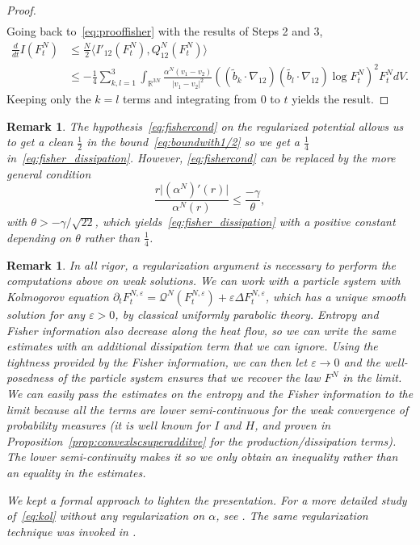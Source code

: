 \documentclass[11pt,a4paper]{article}
\theoremstyle{definition}
\theoremstyle{plain}
\newtheorem{remark}[defi]{Remark}
\begin{document}
\begin{proof}
\begin{align*}
    \end{align*}
    Going back to~\eqref{eq:prooffisher} with the results of Steps 2 and 3,
    \begin{align*}
        \frac{d}{dt} I(F^N_t) &\leq \frac{N}{2}\langle I'_{12}(F^N_t) , Q^N_{12} (F^N_t)\rangle \\
        &\leq -\frac{1}{4}\sum_{k,l=1}^3 \int_{\mathbb{R}^{3N}} \frac{\alpha^N(v_1-v_2)}{\vert v_1-v_2 \vert^2} \left( (\tilde{b}_k\cdot \nabla_{12})( \tilde{b_l}\cdot \nabla_{12})\log F^N_t \right)^2 F^N_t dV.
    \end{align*}
    Keeping only the $k=l$ terms and integrating from $0$ to $t$ yields the result.
    \end{proof}

\begin{remark}
    \label{rem:on0.99}
    The hypothesis~\eqref{eq:fishercond} on the regularized potential allows us to get a clean $\frac{1}{2}$ in the bound~\eqref{eq:boundwith1/2} so we get a $\frac{1}{4}$ in~\eqref{eq:fisher_dissipation}. However, \eqref{eq:fishercond} can be replaced by the more general condition
    \begin{equation*}
    \frac{r \vert (\alpha^{N})'(r) \vert}{\alpha^{N}(r)}\leq \frac{-\gamma}{\theta},
    \end{equation*}
    with $\theta> -\gamma /\sqrt{22}$, which yields~\eqref{eq:fisher_dissipation} with a positive constant depending on $\theta$ rather than
    $\frac{1}{4}$.
\end{remark}

\begin{remark}
    In all rigor, a regularization argument is necessary to perform the computations above on weak solutions. We can work with a particle system with Kolmogorov equation $\partial_t F^{N,\varepsilon}_t = \mathcal{Q}^N( F^{N,\varepsilon}_t)+\varepsilon \Delta F^{N,\varepsilon}_t$, which has a unique \textit{smooth} solution for any $\varepsilon>0$, by classical uniformly parabolic theory. Entropy and Fisher information also decrease along the heat flow, so we can write the same estimates with an additional dissipation term that we can ignore. Using the tightness provided by the Fisher information, we can then let $\varepsilon\rightarrow 0$ and the well-posedness of the particle system ensures that we recover the law $F^N$ in the limit. We can easily pass the estimates on the entropy and the Fisher information to the limit because all the terms are lower semi-continuous for the weak convergence of probability measures (it is well known for $I$ and $H$, and proven in Proposition~\ref{prop:convexlscsuperadditve} for the production/dissipation terms). The lower semi-continuity makes it so we only obtain an inequality rather than an equality in the estimates.
    
    We kept a formal approach to lighten the presentation. For a more detailed study of~\eqref{eq:kol} without any regularization on $\alpha$, see \cite{CarrilloGuo2025}. The same regularization technique was invoked in \cite[Proof of Proposition 5.1]{FournierHaurayMischler2014}.
\end{remark}
\end{document}
